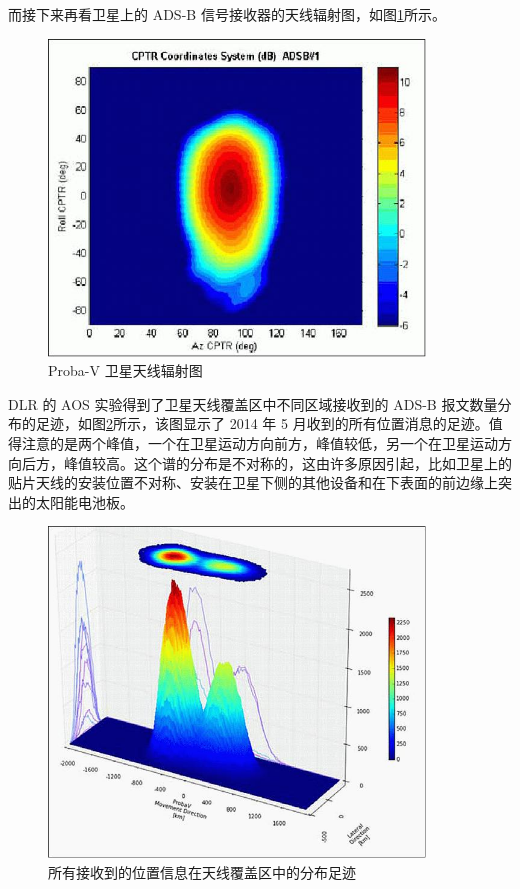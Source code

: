 而接下来再看卫星上的 ADS-B 信号接收器的天线辐射图，如图\ref{fig:ADS-B_Auto4-1}所示。

\begin{figure}[!htb]
\centering
\includegraphics[width=10cm]{pic/ADS-B_Auto4.jpeg}
\caption{Proba-V 卫星天线辐射图\protect\footnotemark}
\label{fig:ADS-B_Auto4-1}
\end{figure}


DLR 的 AOS 实验得到了卫星天线覆盖区中不同区域接收到的 ADS-B 报文数量分布的足迹，如图\ref{fig:ADS-B_Auto5-1}所示，该图显示了 2014 年 5 月收到的所有位置消息的足迹。值得注意的是两个峰值，一个在卫星运动方向前方，峰值较低，另一个在卫星运动方向后方，峰值较高。这个谱的分布是不对称的，这由许多原因引起，比如卫星上的贴片天线的安装位置不对称、安装在卫星下侧的其他设备和在下表面的前边缘上突出的太阳能电池板。

\begin{figure}[!htb]
\centering
\includegraphics[width=10cm]{pic/ADS-B_Auto5.jpeg}
\caption{所有接收到的位置信息在天线覆盖区中的分布足迹\protect\footnotemark}
\label{fig:ADS-B_Auto5-1}
\end{figure}

